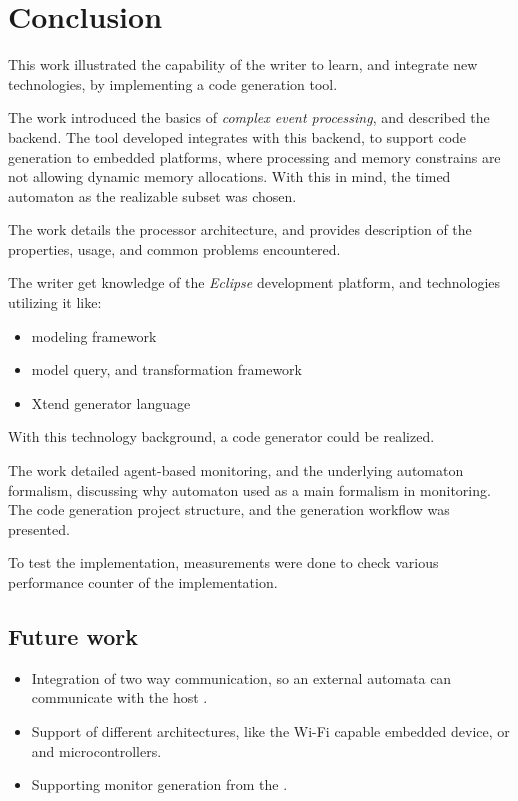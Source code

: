 
\chapter{Conclusion}
\label{ch:conclusion}

This work illustrated the capability of the writer to learn, and integrate new technologies, by implementing a code generation tool.

The work introduced the basics of \emph{complex event processing}, and described the \viatrac{} backend. The tool developed integrates with this backend, to support code generation to embedded platforms, where processing and memory constrains are not allowing dynamic memory allocations. With this in mind, the timed automaton as the realizable subset was chosen.

The work details the \pru{} processor architecture, and provides description of the properties, usage, and common problems encountered.

The writer get knowledge of the \emph{Eclipse} development platform, and technologies utilizing it like:
\begin{itemize}
	\item \emf{} modeling framework
	\item \viatra{} model query, and transformation framework
	\item Xtend generator language
\end{itemize}
With this technology background, a code generator could be realized.

The work detailed agent-based monitoring, and the underlying automaton formalism, discussing why automaton used as a main formalism in monitoring. The code generation project structure, and the generation workflow was presented.

To test the implementation, measurements were done to check various performance counter of the implementation.

\section{Future work}

\begin{itemize}
	\item Integration of two way communication, so an external automata can communicate with the host \viatrac{}.
	\item Support of different architectures, like the 	Wi-Fi capable embedded device, or  and  microcontrollers.
	\item Supporting monitor generation from the .
\end{itemize}

